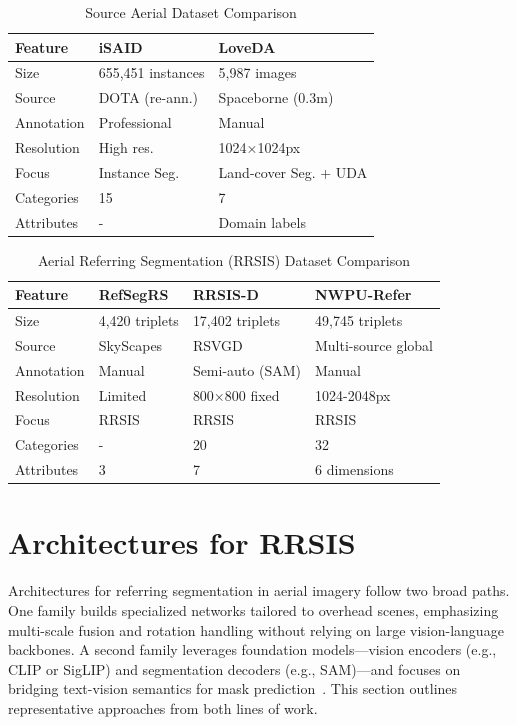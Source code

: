 \begin{table}[htbp]
\centering
\caption{Source Aerial Dataset Comparison}
\label{tab:source_comparison}
\begin{tabular}{@{}lll@{}}
\toprule
\textbf{Feature} & \textbf{iSAID} & \textbf{LoveDA} \\
\midrule
Size & 655,451 instances & 5,987 images \\
Source & DOTA (re-ann.) & Spaceborne (0.3m) \\
Annotation & Professional & Manual \\
Resolution & High res. & 1024×1024px \\
Focus & Instance Seg. & Land-cover Seg. + UDA \\
Categories & 15 & 7 \\
Attributes & - & Domain labels \\
\bottomrule
\end{tabular}
\end{table}

\begin{table}[htbp]
\centering
\caption{Aerial Referring Segmentation (RRSIS) Dataset Comparison}
\label{tab:rrsis_comparison}
\begin{tabular}{@{}llll@{}}
\toprule
\textbf{Feature} & \textbf{RefSegRS} & \textbf{RRSIS-D} & \textbf{NWPU-Refer} \\
\midrule
Size & 4,420 triplets & 17,402 triplets & 49,745 triplets \\
Source & SkyScapes & RSVGD & Multi-source global \\
Annotation & Manual & Semi-auto (SAM) & Manual \\
Resolution & Limited & 800×800 fixed & 1024-2048px \\
Focus & RRSIS & RRSIS & RRSIS \\
Categories & - & 20 & 32 \\
Attributes & 3 & 7 & 6 dimensions \\
\bottomrule
\end{tabular}
\end{table}


\section{Architectures for RRSIS}

Architectures for referring segmentation in aerial imagery follow two broad paths. One family builds specialized networks tailored to overhead scenes, emphasizing multi-scale fusion and rotation handling without relying on large vision-language backbones. A second family leverages foundation models—vision encoders (e.g., CLIP or SigLIP) and segmentation decoders (e.g., SAM)—and focuses on bridging text-vision semantics for mask prediction~\cite{clip,siglip,sam}. This section outlines representative approaches from both lines of work.

